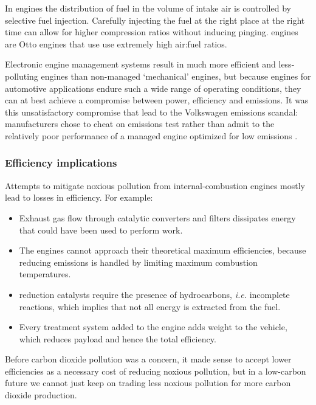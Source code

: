 In  engines the distribution of fuel in the volume of
intake air is controlled by selective fuel injection. Carefully injecting the
fuel at the right place at the right time can allow for higher compression
ratios without inducing pinging.  engines are Otto engines
that use use extremely high air:fuel ratios.

Electronic engine management systems result in much more efficient and
less-polluting engines than non-managed `mechanical' engines, but because
engines for automotive applications endure such a wide range of operating
conditions, they can at best achieve a compromise between power, efficiency and
emissions. It was this unsatisfactory compromise that lead to the Volkswagen
emissions scandal: manufacturers chose to cheat on emissions test rather than
admit to the relatively poor performance of a managed engine optimized for low
emissions \autocite{Mansouri2016}.

\subsubsection{Efficiency implications}

Attempts to mitigate noxious pollution from internal\hyp{}combustion engines
mostly lead to losses in efficiency. For example:

\begin{itemize}

\item Exhaust gas flow through catalytic converters and filters dissipates
energy that could have been used to perform work.
  
\item The engines cannot approach their theoretical maximum efficiencies,
because reducing \nox emissions is handled by limiting maximum combustion
temperatures.

\item \nox reduction catalysts require the presence of hydrocarbons,
\textit{i.e.} incomplete reactions, which implies that not all energy is
extracted from the fuel.

\item Every treatment system added to the engine adds weight to the vehicle, which
reduces payload and hence the total efficiency.

\end{itemize}

Before carbon dioxide pollution was a concern, it made sense to accept lower
efficiencies as a necessary cost of reducing noxious pollution, but in a
low-carbon future we cannot just keep on trading less noxious pollution for more
carbon dioxide production.

